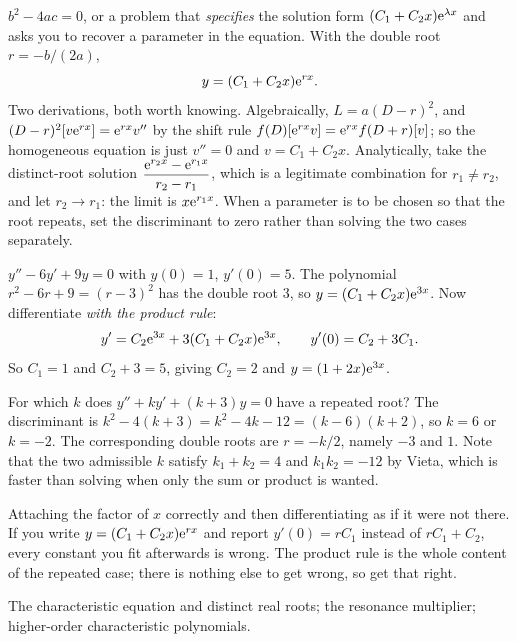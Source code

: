 \cue $b^{2}-4ac=0$, or a problem that \emph{specifies} the solution form $(C_1+C_2x)\mathrm{e}^{\lambda x}$ and asks you to recover a parameter in the equation.
\method With the double root $r=-b/(2a)$,
\[y=(C_1+C_2x)\mathrm{e}^{rx}.\]
Two derivations, both worth knowing. Algebraically, $L=a(D-r)^{2}$, and $(D-r)^{2}[v\mathrm{e}^{rx}]=\mathrm{e}^{rx}v''$ by the shift rule $f(D)[\mathrm{e}^{rx}v]=\mathrm{e}^{rx}f(D+r)[v]$; so the homogeneous equation is just $v''=0$ and $v=C_1+C_2x$. Analytically, take the distinct-root solution $\dfrac{\mathrm{e}^{r_2x}-\mathrm{e}^{r_1x}}{r_2-r_1}$, which is a legitimate combination for $r_1\ne r_2$, and let $r_2\to r_1$: the limit is $x\mathrm{e}^{r_1x}$. When a parameter is to be chosen so that the root repeats, set the discriminant to zero rather than solving the two cases separately.

\begin{worked}
$y''-6y'+9y=0$ with $y(0)=1$, $y'(0)=5$. The polynomial $r^{2}-6r+9=(r-3)^{2}$ has the double root $3$, so $y=(C_1+C_2x)\mathrm{e}^{3x}$. Now differentiate \emph{with the product rule}:
\[y'=C_2\mathrm{e}^{3x}+3(C_1+C_2x)\mathrm{e}^{3x},\qquad y'(0)=C_2+3C_1.\]
So $C_1=1$ and $C_2+3=5$, giving $C_2=2$ and $y=(1+2x)\mathrm{e}^{3x}$.
\end{worked}

\begin{worked}
For which $k$ does $y''+ky'+(k+3)y=0$ have a repeated root? The discriminant is $k^{2}-4(k+3)=k^{2}-4k-12=(k-6)(k+2)$, so $k=6$ or $k=-2$. The corresponding double roots are $r=-k/2$, namely $-3$ and $1$. Note that the two admissible $k$ satisfy $k_1+k_2=4$ and $k_1k_2=-12$ by Vieta, which is faster than solving when only the sum or product is wanted.
\end{worked}

\begin{trap}
Attaching the factor of $x$ correctly and then differentiating as if it were not there. If you write $y=(C_1+C_2x)\mathrm{e}^{rx}$ and report $y'(0)=rC_1$ instead of $rC_1+C_2$, every constant you fit afterwards is wrong. The product rule is the whole content of the repeated case; there is nothing else to get wrong, so get that right.
\end{trap}

\begin{seealsob}The characteristic equation and distinct real roots; the resonance multiplier; higher-order characteristic polynomials.\end{seealsob}

